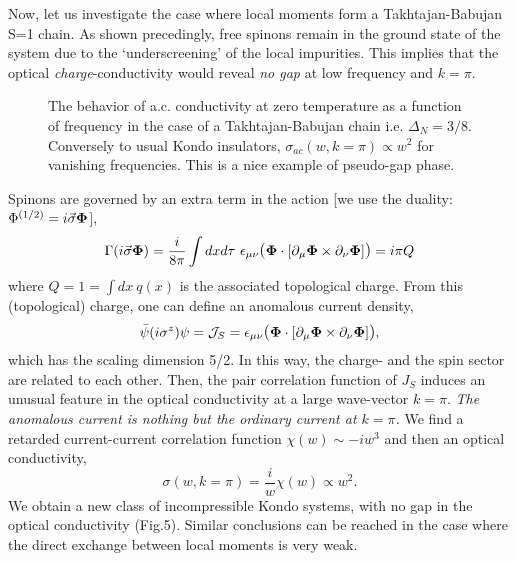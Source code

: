 Now, let us investigate the case where local moments form a 
Takhtajan-Babujan S=1 chain. As shown precedingly,
free spinons remain in the ground state of the system due
to the `underscreening' of the local impurities. This implies that
the optical {\it charge}-conductivity would reveal {\it no gap} 
at low frequency and $k=\pi$. 
\vskip -0.05cm
\begin{figure}
\centerline{}
\vskip 0.5cm
\caption{The behavior of a.c. conductivity at zero temperature as a function
of frequency in the case of a Takhtajan-Babujan chain
i.e. $\Delta_N=3/8$. Conversely to usual Kondo insulators,
$\sigma_{ac}(w,k=\pi)\propto {w}^2$ for vanishing frequencies. This is a nice
example of pseudo-gap phase.}
\end{figure}

Spinons
are governed by an extra term in the action [we use the duality: $\Phi^{(1/2)}=i\vec{\sigma}{\bf \Phi}$],
\begin{equation}
\Gamma(i\vec{\sigma}{\mathbf\Phi})=
\frac{i}{8\pi}\int dxd\tau\ \epsilon_{\mu\nu}\hbox{\large(}{\mathbf\Phi}
\cdot[
\partial_{\mu}{\mathbf\Phi}\times\partial_{\nu}{\mathbf\Phi}]\hbox{\large)}=
i\pi Q
\end{equation}
where $Q=1=\int dx\ q(x)$ is the associated topological charge. From
this (topological) charge, one
can define an anomalous current density\cite{Tsvelik_charge},
\begin{equation}
\bar{\psi}(i\sigma^z)\psi={\cal J}_S=
\epsilon_{\mu\nu}\hbox{\large(}{\mathbf\Phi}
\cdot[
\partial_{\mu}{\mathbf\Phi}\times\partial_{\nu}{\mathbf\Phi}]
\hbox{\large)},
\end{equation}
which has the scaling dimension 5/2. In this way, the charge- and the
spin sector are related to each other. Then, the pair correlation function
of $J_S$ induces an unusual feature in the optical conductivity at 
a large wave-vector $k=\pi$. {\it The anomalous current is nothing but the ordinary
current at $k=\pi$.}
We find a retarded current-current
correlation function $\chi(w)\sim -iw^{3}$ and then an optical conductivity,
\begin{equation}
\sigma(w,k=\pi)=\frac{i}{w}\chi(w)\propto w^2.
\end{equation}
We obtain a new class of
incompressible Kondo systems, with no gap in the optical conductivity
(Fig.5). Similar conclusions can be 
reached in the case where the direct
exchange between local moments is very weak\cite{Tsvelik_charge}. 

